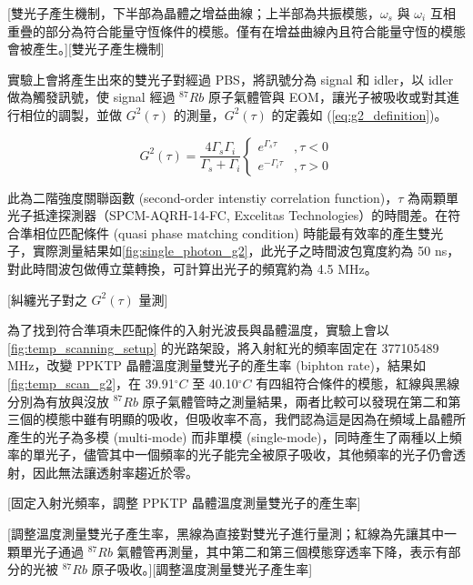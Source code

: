 \documentclass[class=NCU_thesis, crop=false]{standalone}
\begin{document}
[雙光子產生機制，下半部為晶體之增益曲線；上半部為共振模態，$\omega_s$ 與 $\omega_i$ 互相重疊的部分為符合能量守恆條件的模態。僅有在增益曲線內且符合能量守恆的模態會被產生。][雙光子產生機制]

實驗上會將產生出來的雙光子對經過 PBS，將訊號分為 signal 和 idler，以 idler 做為觸發訊號，使 signal 經過 $^{87}Rb$ 原子氣體管與 EOM，讓光子被吸收或對其進行相位的調製，並做 $G^{2}(\tau)$ 的測量，$G^{2}(\tau)$ 的定義如 (\ref{eq:g2_definition})。

\begin{equation}
    G^{2}(\tau)=\frac{4\Gamma_{s}\Gamma_{i}}{\Gamma_{s}+\Gamma_{i}}\left\{\begin{matrix}
        e^{\Gamma_{s}\tau} & ,\tau<0\\
        e^{-\Gamma_{i}\tau} & ,\tau>0
        \end{matrix}\right.
\label{eq:g2_definition}
\end{equation}

此為二階強度關聯函數 (second-order intenstiy correlation function)，$\tau$ 為兩顆單光子抵達探測器（SPCM-AQRH-14-FC, Excelitas Technologies）的時間差。在符合準相位匹配條件 (quasi phase matching condition) 時能最有效率的產生雙光子，實際測量結果如\cref{fig:single_photon_g2}，此光子之時間波包寬度約為 50 ns，對此時間波包做傅立葉轉換，可計算出光子的頻寬約為 4.5 MHz。

[糾纏光子對之 $G^{2}(\tau)$ 量測]


為了找到符合準項未匹配條件的入射光波長與晶體溫度，實驗上會以\cref{fig:temp_scanning_setup} 的光路架設，將入射紅光的頻率固定在 377105489 MHz，改變 PPKTP 晶體溫度測量雙光子的產生率 (biphton rate)，結果如\cref{fig:temp_scan_g2}，在 39.91$^{\circ}C$ 至 40.10$^{\circ}C$ 有四組符合條件的模態，紅線與黑線分別為有放與沒放 $^{87}Rb$ 原子氣體管時之測量結果，兩者比較可以發現在第二和第三個的模態中雖有明顯的吸收，但吸收率不高，我們認為這是因為在頻域上晶體所產生的光子為多模 (multi-mode) 而非單模 (single-mode)，同時產生了兩種以上頻率的單光子，儘管其中一個頻率的光子能完全被原子吸收，其他頻率的光子仍會透射，因此無法讓透射率趨近於零。

[固定入射光頻率，調整 PPKTP 晶體溫度測量雙光子的產生率]

[調整溫度測量雙光子產生率，黑線為直接對雙光子進行量測；紅線為先讓其中一顆單光子通過 $^{87}Rb$ 氣體管再測量，其中第二和第三個模態穿透率下降，表示有部分的光被 $^{87}Rb$ 原子吸收。][調整溫度測量雙光子產生率]
\end{document}
